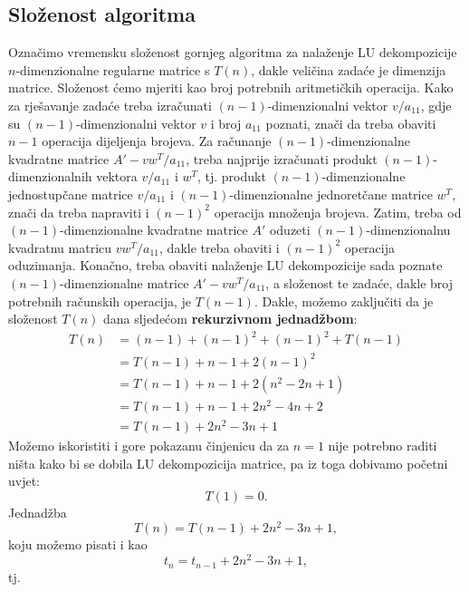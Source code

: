 \documentclass[a4paper,12pt,oneside]{article}
\begin{document}
\subsection*{Složenost algoritma}
Označimo vremensku složenost gornjeg algoritma za nalaženje LU dekompozicije $n$-dimenzionalne regularne matrice s $T(n)$, dakle veličina zadaće je dimenzija matrice. Složenost ćemo mjeriti kao broj potrebnih aritmetičkih operacija. \newline \newline
\noindent Kako za rješavanje zadaće treba izračunati $(n-1)$-dimenzionalni vektor $v/a_{11}$, gdje su $(n-1)$-dimenzionalni vektor $v$ i broj $a_{11}$ poznati, znači da treba obaviti $n-1$ operacija dijeljenja brojeva. \newline\newline
\noindent Za računanje $(n-1)$-dimenzionalne kvadratne matrice $A' - vw^T/a_{11}$, treba najprije izračunati produkt $(n-1)$-dimenzionalnih vektora $v/a_{11}$ i $w^T$, tj. produkt $(n-1)$-dimenzionalne jednostupčane matrice $v/a_{11}$ i $(n-1)$-dimenzionalne jednoretčane matrice $w^T$, znači da treba napraviti i $(n-1)^2$ operacija množenja brojeva. Zatim, treba od $(n-1)$-dimenzionalne kvadratne matrice $A'$ oduzeti $(n-1)$-dimenzionalnu kvadratnu matricu $vw^T/a_{11}$, dakle treba obaviti i $(n-1)^2$ operacija oduzimanja. \newline \newline
\noindent Konačno, treba obaviti nalaženje LU dekompozicije sada poznate $(n-1)$-dimenzionalne matrice $A' - vw^T/a_{11}$, a složenost te zadaće, dakle broj potrebnih računskih operacija, je $T(n-1)$. \newline\newline
\noindent Dakle, možemo zaključiti da je složenost $T(n)$ dana sljedećom \textbf{rekurzivnom jednadžbom}:
\begin{align*}
	T(n) &= (n - 1) + (n - 1)^2 + (n-1)^2 + T(n-1) \\
	     &= T(n-1) + n - 1 + 2(n - 1)^2 \\
	     &= T(n-1)+n-1+2(n^2-2n+1) \\
	     &=T(n-1) +n-1+2n^2-4n+2 \\
	     &=T(n-1)+2n^2 -3n +1
\end{align*}
Možemo iskoristiti i gore pokazanu činjenicu da za $n=1$ nije potrebno raditi ništa kako bi se dobila LU dekompozicija matrice, pa iz toga dobivamo početni uvjet:
$$T(1)=0.$$
Jednadžba
$$T(n)=T(n-1)+2n^2 -3n +1,$$
koju možemo pisati i kao
$$t_n = t_{n-1} +2n^2 -3n +1,$$
tj.
\end{document}
